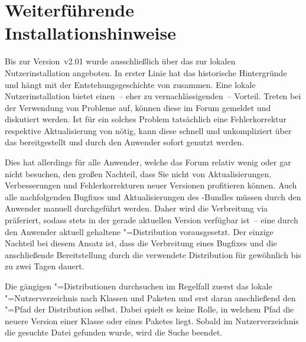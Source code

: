 \chapter{Weiterführende Installationshinweise}
%
\noindent{}

\bigskip\noindent
Bis zur Version~v2.01 wurde \TUDScript ausschließlich über das \Forum zur 
lokalen Nutzerinstallation angeboten. In erster Linie hat das historische 
Hintergründe und hängt mit der Entstehungsgeschichte von \TUDScript zusammen. 
Eine lokale Nutzerinstallation bietet einen~-- eher zu vernachlässigenden~-- 
Vorteil. Treten bei der Verwendung von \TUDScript Probleme auf, können diese im 
Forum gemeldet und diskutiert werden. Ist für ein solches Problem tatsächlich 
eine Fehlerkorrektur respektive Aktualisierung von \TUDScript nötig, kann diese 
schnell und unkompliziert über das \GitHubRepo bereitgestellt und durch den 
Anwender sofort genutzt werden.

Dies hat allerdings für alle Anwender, welche das Forum relativ wenig oder gar 
nicht besuchen, den großen Nachteil, dass Sie nicht von Aktualisierungen, 
Verbesserungen und Fehlerkorrekturen neuer Versionen profitieren können. Auch 
alle nachfolgenden Bugfixes und Aktualisierungen des \TUDScript-Bundles müssen 
durch den Anwender manuell durchgeführt werden. Daher wird die Verbreitung via 
 präferiert, sodass \TUDScript stets in der gerade aktuellen 
Version verfügbar ist~-- eine durch den Anwender aktuell gehaltene 
"=Distribution vorausgesetzt. Der einzige Nachteil bei diesem 
Ansatz ist, dass die Verbreitung eines Bugfixes und die anschließende 
Bereitstellung durch die verwendete Distribution für gewöhnlich bis zu zwei 
Tagen dauert.

Die gängigen "=Distributionen durchsuchen im Regelfall zuerst das 
lokale "=Nutzerverzeichnis nach Klassen und Paketen und erst daran 
anschließend den "=Pfad der Distribution selbst. Dabei spielt es 
keine Rolle, in welchem Pfad die neuere Version einer Klasse oder eines Paketes 
liegt. Sobald im Nutzerverzeichnis die gesuchte Datei gefunden wurde, wird die 
Suche beendet.

